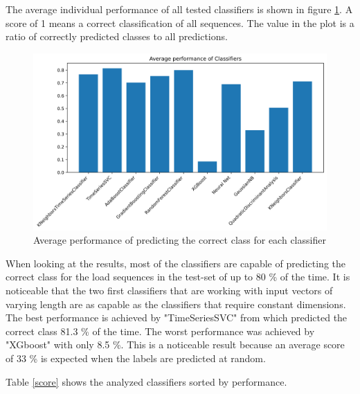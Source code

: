 The average individual performance of all tested classifiers is shown in figure \ref{fig:avgperf}. 
A score of 1 means a correct classification of all sequences. The value in the plot is a ratio of correctly predicted classes to all predictions.

\begin{figure}[H]
	\centering
	\includegraphics[width=1\linewidth]{IMGs/Average_performance_CLASS.png}
	\caption{Average performance of predicting the correct class for each classifier}
	\label{fig:avgperf}
\end{figure}

When looking at the results, most of the classifiers are capable of predicting the correct class for the load sequences in the test-set of up to 80 \% of the time. 
It is noticeable that the two first classifiers that are working with input vectors of varying length are as capable as the classifiers that require constant dimensions. The best performance is achieved by "TimeSeriesSVC" from \cite{tslearn} which predicted the correct class 81.3 \% of the time. The worst performance was achieved by "XGboost" with only 8.5 \%. This is a noticeable result because an average score of 33 \% is expected when the labels are predicted at random. 

Table \ref{score} shows the analyzed classifiers sorted by performance. 

